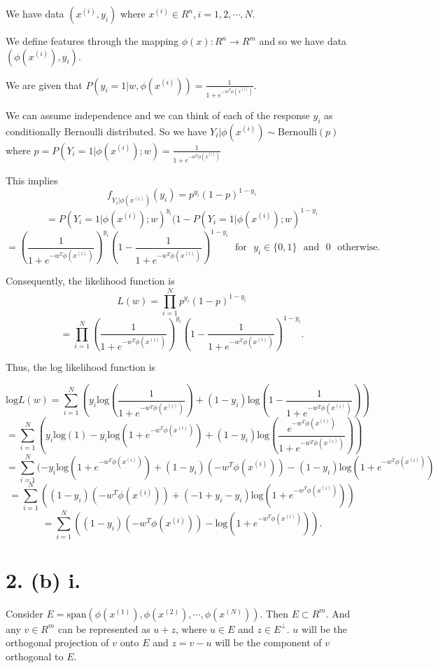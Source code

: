 \documentclass[]{article}
\begin{document}
We have data \((x^{(i)},y_i)\) where
\(x^{(i)} \in R^n, i=1,2, \cdots, N.\)

We define features through the mapping \(\phi(x): R^n \to R^m\) and so
we have data \((\phi(x^{(i)}),y_i)\).

We are given that
\(P(y_i=1|w,\phi(x^{(i)}))=\frac{1}{1+e^{-w^T\phi(x^{(i)})}}.\)

We can assume independence and we can think of each of the response
\(y_i\) as conditionally Bernoulli distributed. So we have
\(Y_i|\phi(x^{(i)}) \sim \text{Bernoulli}(p)\) where
\(p=P(Y_i=1|\phi(x^{(i)});w)=\frac{1}{1+e^{-w^T\phi(x^{(i)})}}\)

This implies \[f_{Y_i|\phi(x^{(i)})}(y_i)=p^{y_i}(1-p)^{1-y_i}\]
\[=P(Y_i=1|\phi(x^{(i)});w)^{y_i}(1-P(Y_i=1|\phi(x^{(i)});w)^{1-y_i}\]
\[=(\frac{1}{1+e^{-w^T\phi(x^{(i)})}})^{y_i}(1-\frac{1}{1+e^{-w^T\phi(x^{(i)})}})^{1-y_i}~~~\text{for}~~~y_i \in \{0,1\}~~~\text{and}~~~0~~~\text{otherwise}.\]

Consequently, the likelihood function is
\[L(w)= \displaystyle \prod_{i=1}^{N}p^{y_i}(1-p)^{1-y_i}\]
\[=\displaystyle \prod_{i=1}^{N}(\frac{1}{1+e^{-w^T\phi(x^{(i)})}})^{y_i}(1-\frac{1}{1+e^{-w^T\phi(x^{(i)})}})^{1-y_i}.\]

Thus, the log likelihood function is

\[\text{log} L(w)=\displaystyle\sum_{i=1}^{N}(y_i\text{log}(\frac{1}{1+e^{-w^T\phi(x^{(i)})}})+(1-y_i)\text{log}(1-\frac{1}{1+e^{-w^T\phi(x^{(i)})}}))\]
\[=\displaystyle \sum_{i=1}^{N}(y_i\text{log}(1)-y_i\text{log}(1+e^{-w^T\phi(x^{(i)})})+(1-y_i)\text{log}(\frac{e^{-w^T\phi(x^{(i)})}}{1+e^{-w^T\phi(x^{(i)})}}))\]
\[= \displaystyle \sum_{i=1}^{N}(-y_i\text{log}(1+e^{-w^T\phi(x^{(i)})})+(1-y_i)(-w^T\phi(x^{(i)}))-(1-y_i)\text{log}(1+e^{-w^T\phi(x^{(i)})})\]
\[= \displaystyle \sum_{i=1}^{N}((1-y_i)(-w^T\phi(x^{(i)}))+(-1+y_i-y_i)\text{log}(1+e^{-w^T\phi(x^{(i)})}))\]
\[=\displaystyle \sum_{i=1}^{N}((1-y_i)(-w^T\phi(x^{(i)}))-\text{log}(1+e^{-w^T\phi(x^{(i)})})).\]

\hypertarget{b-i.}{%
\section{2. (b) i.}\label{b-i.}}

Consider
\(E=\text{span}(\phi(x^{(1)}), \phi(x^{(2)}), \cdots, \phi(x^{(N)}))\).
Then \(E \subset R^m.\) And any \(v \in R^m\) can be represented as
\(u+z\), where \(u\in E\) and \(z\in E^{\perp}.\) \(u\) will be the
orthogonal projection of \(v\) onto \(E\) and \(z=v-u\) will be the
component of \(v\) orthogonal to \(E\).
\end{document}
